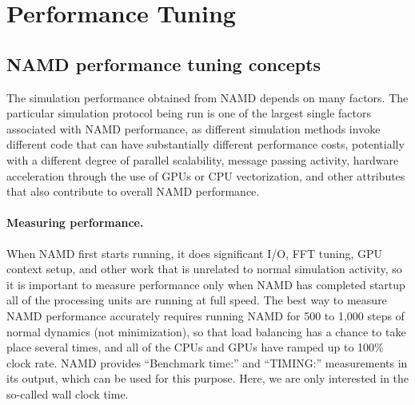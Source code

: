 \section{Performance Tuning}
\label{section:performance}

\subsection{NAMD performance tuning concepts}
The simulation performance obtained from NAMD depends on many factors.
The particular simulation protocol being run is one of the largest
single factors associated with NAMD performance, as different simulation
methods invoke different code that can have substantially different 
performance costs, potentially with a different degree of parallel
scalability, message passing activity, hardware acceleration through
the use of GPUs or CPU vectorization,
and other attributes that also contribute to overall NAMD performance.

\paragraph{Measuring performance.}
When NAMD first starts running, it does significant I/O, FFT tuning,
GPU context setup, and other work that is unrelated to normal 
simulation activity, so it is important to measure performance only
when NAMD has completed startup all of the processing units are 
running at full speed.
The best way to measure NAMD performance accurately requires running
NAMD for 500 to 1,000 steps of normal dynamics (not minimization), 
so that load balancing has a chance to 
take place several times, and all of the CPUs and GPUs have ramped up
to 100\% clock rate.  NAMD provides ``Benchmark time:'' and ``TIMING:''
measurements in its output, which can be used for this purpose.  
Here, we are only interested in the so-called wall clock time.

